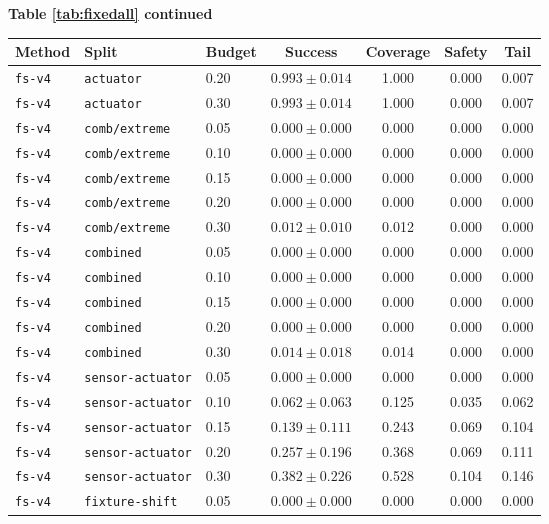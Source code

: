 \documentclass{article}
\begin{document}
\begin{center}
\textbf{Table \ref{tab:fixedall} continued}\\[0.4ex]
\begin{tabular}{lllcccc}
\toprule
Method & Split & Budget & Success & Coverage & Safety & Tail \\
\midrule
\texttt{fs-v4} & \texttt{actuator} & 0.20 & $0.993 \pm 0.014$ & 1.000 & 0.000 & 0.007 \\
\texttt{fs-v4} & \texttt{actuator} & 0.30 & $0.993 \pm 0.014$ & 1.000 & 0.000 & 0.007 \\
\texttt{fs-v4} & \texttt{comb/extreme} & 0.05 & $0.000 \pm 0.000$ & 0.000 & 0.000 & 0.000 \\
\texttt{fs-v4} & \texttt{comb/extreme} & 0.10 & $0.000 \pm 0.000$ & 0.000 & 0.000 & 0.000 \\
\texttt{fs-v4} & \texttt{comb/extreme} & 0.15 & $0.000 \pm 0.000$ & 0.000 & 0.000 & 0.000 \\
\texttt{fs-v4} & \texttt{comb/extreme} & 0.20 & $0.000 \pm 0.000$ & 0.000 & 0.000 & 0.000 \\
\texttt{fs-v4} & \texttt{comb/extreme} & 0.30 & $0.012 \pm 0.010$ & 0.012 & 0.000 & 0.000 \\
\texttt{fs-v4} & \texttt{combined} & 0.05 & $0.000 \pm 0.000$ & 0.000 & 0.000 & 0.000 \\
\texttt{fs-v4} & \texttt{combined} & 0.10 & $0.000 \pm 0.000$ & 0.000 & 0.000 & 0.000 \\
\texttt{fs-v4} & \texttt{combined} & 0.15 & $0.000 \pm 0.000$ & 0.000 & 0.000 & 0.000 \\
\texttt{fs-v4} & \texttt{combined} & 0.20 & $0.000 \pm 0.000$ & 0.000 & 0.000 & 0.000 \\
\texttt{fs-v4} & \texttt{combined} & 0.30 & $0.014 \pm 0.018$ & 0.014 & 0.000 & 0.000 \\
\texttt{fs-v4} & \texttt{sensor-actuator} & 0.05 & $0.000 \pm 0.000$ & 0.000 & 0.000 & 0.000 \\
\texttt{fs-v4} & \texttt{sensor-actuator} & 0.10 & $0.062 \pm 0.063$ & 0.125 & 0.035 & 0.062 \\
\texttt{fs-v4} & \texttt{sensor-actuator} & 0.15 & $0.139 \pm 0.111$ & 0.243 & 0.069 & 0.104 \\
\texttt{fs-v4} & \texttt{sensor-actuator} & 0.20 & $0.257 \pm 0.196$ & 0.368 & 0.069 & 0.111 \\
\texttt{fs-v4} & \texttt{sensor-actuator} & 0.30 & $0.382 \pm 0.226$ & 0.528 & 0.104 & 0.146 \\
\texttt{fs-v4} & \texttt{fixture-shift} & 0.05 & $0.000 \pm 0.000$ & 0.000 & 0.000 & 0.000 \\

\end{tabular}
\end{center}
\end{document}
